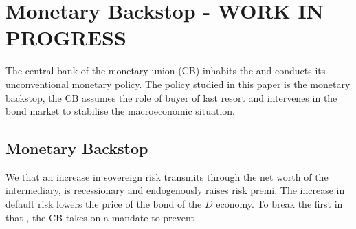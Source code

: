 %
%
%
%

\section{Monetary Backstop - WORK IN PROGRESS}
\label{sec:policy}

The central bank of the monetary union (CB) inhabits the  and conducts its unconventional monetary policy. The  policy studied in this paper is the monetary backstop,  the CB assumes the role of  buyer of last resort and intervenes in the bond market to stabilise the macroeconomic situation.

\subsection{Monetary Backstop}
We  that an increase in sovereign risk transmits through the net worth of the intermediary, is recessionary\yadd{,} and endogenously raises risk premi. The  increase in default risk lowers the price of the bond of the $D$ economy. To break the first  in that , the CB takes on a mandate to prevent .

